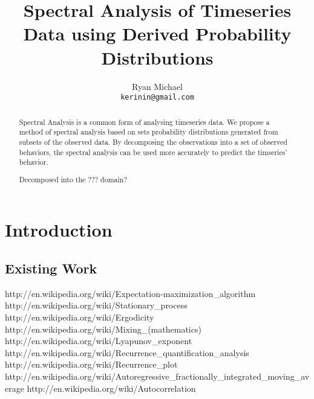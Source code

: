 \documentclass[10pt]{article}
\begin{document}
\title{Spectral Analysis of Timeseries Data using Derived Probability Distributions}
\author{Ryan Michael\\ \texttt{kerinin@gmail.com}}
\maketitle

\begin{abstract}
Spectral Analysis is a common form of analysing timeseries data.  We propose a method of spectral analysis based on sets probability distributions generated from subsets of the observed data.  By decomposing the observations into a set of observed behaviors, the spectral analysis can be used more accurately to predict the timseries' behavior.

Decomposed into the ??? domain?
\end{abstract}

\section{Introduction}

\subsection{Existing Work}
http://en.wikipedia.org/wiki/Expectation-maximization_algorithm
http://en.wikipedia.org/wiki/Stationary_process
http://en.wikipedia.org/wiki/Ergodicity
http://en.wikipedia.org/wiki/Mixing_(mathematics)
http://en.wikipedia.org/wiki/Lyapunov_exponent
http://en.wikipedia.org/wiki/Recurrence_quantification_analysis
http://en.wikipedia.org/wiki/Recurrence_plot
http://en.wikipedia.org/wiki/Autoregressive_fractionally_integrated_moving_average
http://en.wikipedia.org/wiki/Autocorrelation


\end{document}

